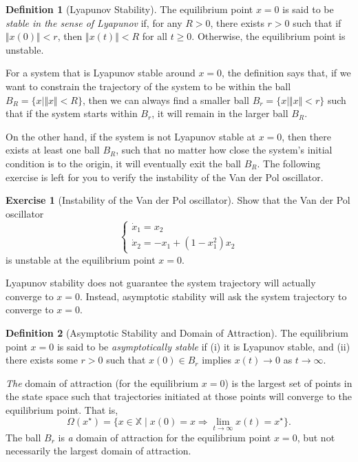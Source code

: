 \documentclass[
]{book}
\theoremstyle{definition}
\newtheorem{definition}{Definition}[chapter]
\theoremstyle{definition}
\theoremstyle{definition}
\newtheorem{exercise}{Exercise}[chapter]
\theoremstyle{definition}
\theoremstyle{remark}
\begin{document}
\begin{definition}[Lyapunov Stability]
\protect\hypertarget{def:lyapunovstability}{}\label{def:lyapunovstability}The equilibrium point \(x=0\) is said to be \emph{stable in the sense of Lyapunov} if, for any \(R > 0\), there exists \(r >0\) such that if \(\Vert x(0) \Vert < r\), then \(\Vert x(t) \Vert < R\) for all \(t \geq 0\). Otherwise, the equilibrium point is unstable.
\end{definition}

For a system that is Lyapunov stable around \(x=0\), the definition says that, if we want to constrain the trajectory of the system to be within the ball \(B_R = \{ x \mid \Vert x \Vert < R \}\), then we can always find a smaller ball \(B_r = \{ x \mid \Vert x \Vert < r \}\) such that if the system starts within \(B_r\), it will remain in the larger ball \(B_R\).

On the other hand, if the system is not Lyapunov stable at \(x=0\), then there exists at least one ball \(B_R\), such that no matter how close the system's initial condition is to the origin, it will eventually exit the ball \(B_R\). The following exercise is left for you to verify the instability of the Van der Pol oscillator.

\begin{exercise}[Instability of the Van der Pol oscillator]
\protect\hypertarget{exr:instabilityvanderpol}{}\label{exr:instabilityvanderpol}Show that the Van der Pol oscillator
\[
\begin{cases}
\dot{x}_1 = x_2 \\
\dot{x}_2 = - x_1 + (1-x_1^2) x_2
\end{cases}
\]
is unstable at the equilibrium point \(x = 0\).
\end{exercise}

Lyapunov stability does not guarantee the system trajectory will actually converge to \(x =0\). Instead, asymptotic stability will ask the system trajectory to converge to \(x=0\).

\begin{definition}[Asymptotic Stability and Domain of Attraction]
\protect\hypertarget{def:asymptoticstability}{}\label{def:asymptoticstability}The equilibrium point \(x = 0\) is said to be \emph{asymptotically stable} if (i) it is Lyapunov stable, and (ii) there exists some \(r > 0\) such that \(x(0) \in B_r\) implies \(x(t) \rightarrow 0\) as \(t \rightarrow \infty\).

\emph{The} domain of attraction (for the equilibrium \(x=0\)) is the largest set of points in the state space such that trajectories initiated at those points will converge to the equilibrium point. That is,
\[
\Omega(x^\star) = \{ x \in \mathbb{X} \mid x(0) = x \Longrightarrow \lim_{t \rightarrow \infty} x(t) = x^\star \}.
\]
The ball \(B_r\) is \emph{a} domain of attraction for the equilibrium point \(x=0\), but not necessarily the largest domain of attraction.
\end{definition}
\end{document}
